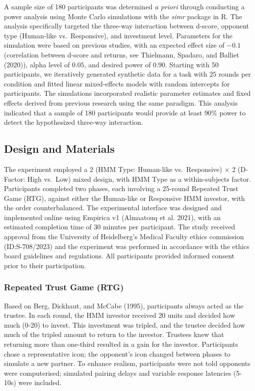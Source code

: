 \documentclass[
]{article}
\begin{document}
A sample size of 180 participants was determined \emph{a priori} through conducting a power analysis using Monte Carlo simulations with the \emph{simr} package in R. The analysis specifically targeted the three-way interaction between d-score, opponent type (Human-like vs.~Responsive), and investment level. Parameters for the simulation were based on previous studies, with an expected effect size of \(-0.1\) (correlation between d-score and returns, see Thielmann, Spadaro, and Balliet (2020)), alpha level of \(0.05\), and desired power of \(0.90\). Starting with 50 participants, we iteratively generated synthetic data for a task with \(25\) rounds per condition and fitted linear mixed-effects models with random intercepts for participants. The simulations incorporated realistic parameter estimates and fixed effects derived from previous research using the same paradigm. This analysis indicated that a sample of 180 participants would provide at least \(90\%\) power to detect the hypothesized three-way interaction.

\subsection{Design and Materials}\label{design-and-materials}

The experiment employed a 2 (HMM Type: Human-like vs.~Responsive) × 2 (D-Factor: High vs.~Low) mixed design, with HMM Type as a within-subjects factor. Participants completed two phases, each involving a 25-round Repeated Trust Game (RTG), against either the Human-like or Responsive HMM investor, with the order counterbalanced.
The experimental interface was designed and implemented online using Empirica v1 (Almaatouq et al. 2021), with an estimated completion time of 30 minutes per participant. The study received approval from the University of Heidelberg's Medical Faculty ethics commission (ID:S-708/2023) and the experiment was performed in accordance with the ethics board guidelines and regulations. All participants provided informed consent prior to their participation.

\subsubsection{Repeated Trust Game (RTG)}\label{repeated-trust-game-rtg}

Based on Berg, Dickhaut, and McCabe (1995), participants always acted as the trustee. In each round, the HMM investor received 20 units and decided how much (0-20) to invest. This investment was tripled, and the trustee decided how much of the tripled amount to return to the investor. Trustees knew that returning more than one-third resulted in a gain for the investor. Participants chose a representative icon; the opponent's icon changed between phases to simulate a new partner. To enhance realism, participants were not told opponents were computerised; simulated pairing delays and variable response latencies (5-10s) were included.
\end{document}
